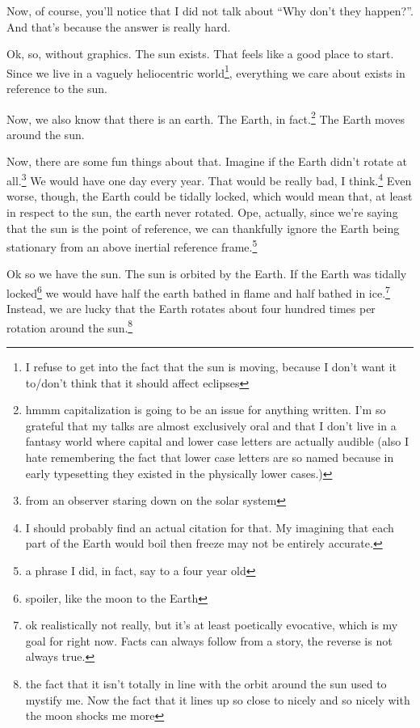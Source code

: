 \documentclass[12pt]{article}[titlepage]
\newcommand{\say}[1]{``#1''}
\newcommand{\1}{\={a}}
\newcommand{\2}{\={e}}
\newcommand{\3}{\={\i}}
\newcommand{\4}{\=o}
\newcommand{\5}{\=u}
\newcommand{\6}{\={A}}
\renewcommand{\,}{\textsuperscript{,}}
\begin{document}
Now, of course, you'll notice that I did not talk about \say{Why don't they happen?}.
And that's because the answer is really hard.

Ok, so, without graphics.
The sun exists.
That feels like a good place to start.
Since we live in a vaguely heliocentric world\footnote{I refuse to get into the fact that the sun is moving, because I don't want it to/don't think that it should affect eclipses}, everything we care about exists in reference to the sun.

Now, we also know that there is an earth.
The Earth, in fact.\footnote{hmmm capitalization is going to be an issue for anything written. I'm so grateful that my talks are almost exclusively oral and that I don't live in a fantasy world where capital and lower case letters are actually audible (also I hate remembering the fact that lower case letters are so named because in early typesetting they existed in the physically lower cases.)}
The Earth moves around the sun.

Now, there are some fun things about that.
Imagine if the Earth didn't rotate at all.\footnote{from an observer staring down on the solar system}
We would have one day every year.
That would be really bad, I think.\footnote{I should probably find an actual citation for that. My imagining that each part of the Earth would boil then freeze may not be entirely accurate.}
Even worse, though, the Earth could be tidally locked, which would mean that, at least in respect to the sun, the earth never rotated.
Ope, actually, since we're saying that the sun is the point of reference, we can thankfully ignore the Earth being stationary from an above inertial reference frame.\footnote{a phrase I did, in fact, say to a four year old}

Ok so we have the sun.
The sun is orbited by the Earth.
If the Earth was tidally locked\footnote{spoiler, like the moon to the Earth} we would have half the earth bathed in flame and half bathed in ice.\footnote{ok realistically not really, but it's at least poetically evocative, which is my goal for right now. Facts can always follow from a story, the reverse is not always true.}
Instead, we are lucky that the Earth rotates about four hundred times per rotation around the sun.\footnote{the fact that it isn't totally in line with the orbit around the sun used to mystify me. Now the fact that it lines up so close to nicely and so nicely with the moon shocks me more}
\end{document}
